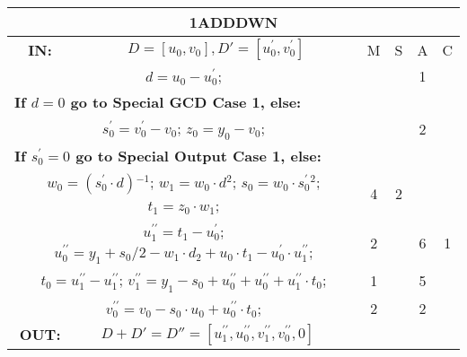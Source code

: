 \begin{tabular}{|c|cr|c|c|c|c|}
\hline
\multicolumn{7}{|c|}{\bf{1ADDDWN}} \TS \\
\hline
\bf{IN:} &\multicolumn{2}{|c|}{$D = [u_0,v_0], D' = [u^{\prime}_0,v^{\prime}_0]$}
\TS & M & \hspace{1pt}S\hspace{1pt} & A & \hspace{1pt}C\hspace{1pt} \\
\hline
\multicolumn{3}{|R{340pt}|}{ 
$d=u_0-u^{\prime}_0$;\hspace{4pt}
} &  &  & 1 & \\
\multicolumn{3}{|l|}{ 
 \bf{If $d = 0$ go to Special GCD Case 1, else:} } &  &  &  & \\
\multicolumn{3}{|R{340pt}|}{ 
$s^{\prime}_0=v^{\prime}_0-v_0$;\hspace{4pt}
$z_0=y_0-v_0$;\hspace{4pt}
} &  &  & 2 & \\
\multicolumn{3}{|l|}{ 
 \bf{If $s^{\prime}_0 = 0$ go to Special Output Case 1, else:} } &  &  &  & \\
\multicolumn{3}{|R{340pt}|}{ 
$w_0=(s^{\prime}_0 \cdot d){}^{-1}$;\hspace{4pt}
$w_1=w_0 \cdot d{}^{2}$;\hspace{4pt}
$s_0=w_0 \cdot s^{\prime}_0{}^{2}$;\hspace{4pt}
$t_1=z_0 \cdot w_1$;\hspace{4pt}
} & 4 & 2 &  & \\
\multicolumn{3}{|R{340pt}|}{ 
$u^{\prime\prime}_1=t_1-u^{\prime}_0$;\hspace{4pt}
$u^{\prime\prime}_0=y_1+s_0/2-w_1 \cdot d_2+u_0 \cdot t_1-u^{\prime}_0 \cdot u^{\prime\prime}_1$;\hspace{4pt}
} & 2 &  & 6 & 1\\
\multicolumn{3}{|R{340pt}|}{ 
$t_0=u^{\prime\prime}_1-u^{\prime\prime}_1$;\hspace{4pt}
$v^{\prime\prime}_1=y_1-s_0+u^{\prime\prime}_0+u^{\prime\prime}_0+u^{\prime\prime}_1 \cdot t_0$;\hspace{4pt}
} & 1 &  & 5 & \\
\multicolumn{3}{|R{340pt}|}{ 
$v^{\prime\prime}_0=v_0-s_0 \cdot u_0+u^{\prime\prime}_0 \cdot t_0$;\hspace{4pt}
} & 2 &  & 2 & \\
\hline
\bf{OUT:} & \hspace*{65pt} $D + D' = D'' = [u^{\prime\prime}_1,u^{\prime\prime}_0,v^{\prime\prime}_1,v^{\prime\prime}_0,0]$

\end{tabular}
